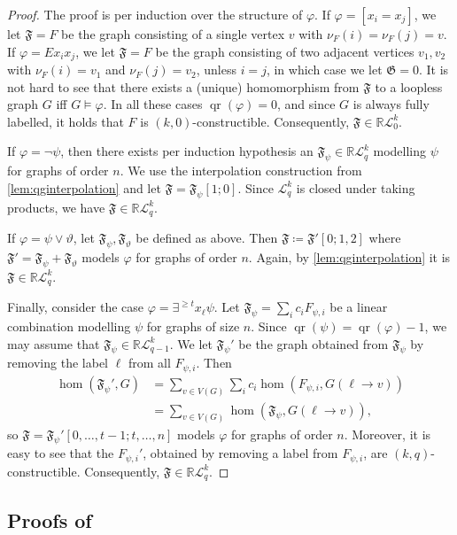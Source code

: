 \documentclass[a4paper,UKenglish,cleveref, autoref, thm-restate]{lipics-v2021}
\renewcommand{\phi}{\varphi}
\renewcommand{\theta}{\vartheta}
\newcommand{\R}{\ensuremath{\mathbb{R}}}
\newcommand{\Lkq}{\ensuremath{\mathcal{L}_{q}^{k}}}
\newcommand{\LParam}[2]{\ensuremath{\mathcal{L}_{#2}^{#1}}}
\newcommand{\qg}[1]{\ensuremath{\mathfrak{#1}}} \newcommand{\qgp}[3]{\ensuremath{\mathfrak{#1}[#3; #2]}}
\DeclareMathOperator{\qr}{qr}
\newcommand{\elimOrd}[2]{$(#1,#2)$-constructible}
\begin{document}
  \qgFromCkq*

  \begin{proof}
    The proof is per induction over the structure of $\phi$. If $\phi = [x_i = x_j]$, we let $\qg{F} = F$ be the graph consisting of a single vertex $v$ with $\nu_F(i) = \nu_F(j) = v$. If $\phi = Ex_ix_j$, we let $\qg{F} = F$ be the graph consisting of two adjacent vertices $v_1, v_2$ with $\nu_F(i) = v_1$ and $\nu_F(j) = v_2$, unless $i = j$, in which case we let $\qg{G} = 0$. It is not hard to see that there exists a (unique) homomorphism from $\qg{F}$ to a loopless graph $G$ iff $G \models \varphi$. In all these cases $\qr(\phi) = 0$, and since $G$ is always fully labelled, it holds that $F$ is \elimOrd{k}{0}. Consequently, $\qg{F} \in \R\LParam{k}{0}$.

    If $\phi = \neg \psi$, then there exists per induction hypothesis an $\qg{F}_\psi \in \R\Lkq$ modelling $\psi$ for graphs of order $n$. We use the interpolation construction from \cref{lem:qginterpolation} and let $\qg{F} = \qgp{F_\psi}{0}{1}$. Since $\Lkq$ is closed under taking products, we have $\qg{F} \in \R\Lkq$.

    If $\phi = \psi \lor \theta$, let $\qg{F_\psi}, \qg{F_\theta}$ be defined as above. Then $\qg{F} \coloneqq \qgp{F'}{1, 2}{0}$ where $\qg{F'} = \qg{F_\psi} + \qg{F_\theta}$ models $\phi$ for graphs of order $n$. Again, by \cref{lem:qginterpolation} it is $\qg{F} \in \R\Lkq$.

    Finally, consider the case $\phi = \exists^{\geq t} x_\ell \psi$. Let $\qg{F_\psi} = \sum_{i}c_iF_{\psi, i}$ be a linear combination modelling $\psi$ for graphs of size $n$. Since $\qr(\psi) = \qr(\phi) - 1$, we may assume that $\qg{F_\psi} \in \R\LParam{k}{q-1}$.
    We let $\qg{F_\psi'}$ be the graph obtained from $\qg{F_\psi}$ by removing the label $\ell$ from all $F_{\psi, i}$. Then
        \begin{align*}
          \hom(\qg{F_\psi'}, G) &= \sum_{v \in V(G)}\sum_i c_i\hom(F_{\psi, i}, G(\ell \to v))\\
          &= \sum_{v \in V(G)}\hom(\qg{F_\psi}, G(\ell \to v)),
        \end{align*}
    so $\qg{F} = \qgp{F_\psi'}{t, \dots, n}{0, \dots, t-1}$ models $\phi$ for graphs of order $n$. Moreover, it is easy to see that the $F_{\psi, i}'$, obtained by removing a label from $F_{\psi, i}$, are \elimOrd{k}{q}. Consequently, $\qg{F} \in \R\Lkq$.
  \end{proof}

  \subsection{Proofs of }
  \label{app:gc-homind}
\end{document}
